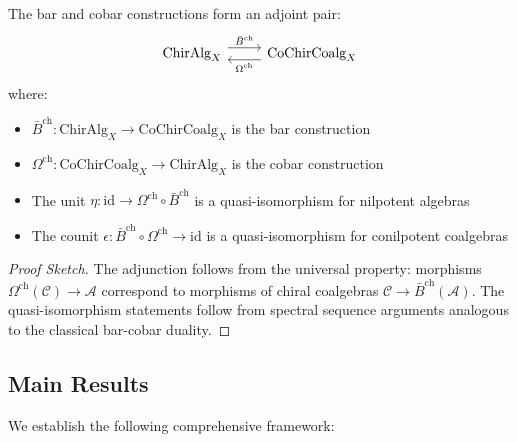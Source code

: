 \begin{theorem}\label{thm:bar-cobar-adj}
The bar and cobar constructions form an adjoint pair:
\[
\begin{tikzcd}
\text{ChirAlg}_X \arrow[r, shift left=1ex, "\bar{B}^{\text{ch}}"] & \text{CoChirCoalg}_X \arrow[l, shift left=1ex, "\Omega^{\text{ch}}"]
\end{tikzcd}
\]
where:
\begin{itemize}
\item $\bar{B}^{\text{ch}}: \text{ChirAlg}_X \to \text{CoChirCoalg}_X$ is the bar construction
\item $\Omega^{\text{ch}}: \text{CoChirCoalg}_X \to \text{ChirAlg}_X$ is the cobar construction
\item The unit $\eta: \text{id} \to \Omega^{\text{ch}} \circ \bar{B}^{\text{ch}}$ is a quasi-isomorphism for nilpotent algebras
\item The counit $\epsilon: \bar{B}^{\text{ch}} \circ \Omega^{\text{ch}} \to \text{id}$ is a quasi-isomorphism for conilpotent coalgebras
\end{itemize}
\end{theorem}

\begin{proof}[Proof Sketch]
The adjunction follows from the universal property: morphisms $\Omega^{\text{ch}}(\mathcal{C}) \to \mathcal{A}$ correspond to morphisms of chiral coalgebras $\mathcal{C} \to \bar{B}^{\text{ch}}(\mathcal{A})$. The quasi-isomorphism statements follow from spectral sequence arguments analogous to the classical bar-cobar duality.
\end{proof}
 
\subsection{Main Results}
 
We establish the following comprehensive framework:
 
